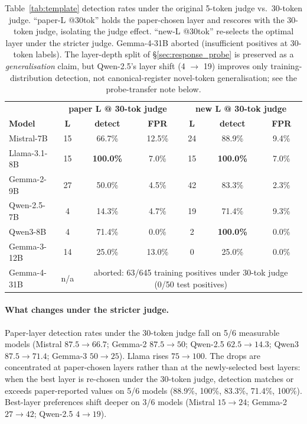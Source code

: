 \documentclass{article}
\begin{document}
\begin{table}[H]
\centering
\small
\caption{Table~\ref{tab:template} detection rates under the original 5-token judge vs.\ 30-token judge. ``paper-L @30tok'' holds the paper-chosen layer and rescores with the 30-token judge, isolating the judge effect. ``new-L @30tok'' re-selects the optimal layer under the stricter judge. Gemma-4-31B aborted (insufficient positives at 30-token labels). The layer-depth split of \S\ref{sec:response_probe} is preserved as a \emph{generalisation} claim, but Qwen-2.5's layer shift (4 $\to$ 19) improves only training-distribution detection, not canonical-register novel-token generalisation; see the probe-transfer note below.}
\label{tab:e9_table3}
\begin{tabular}{lccc|ccc}
\toprule
& \multicolumn{3}{c|}{\textbf{paper L @ 30-tok judge}} & \multicolumn{3}{c}{\textbf{new L @ 30-tok judge}} \\
\textbf{Model} & \textbf{L} & \textbf{detect} & \textbf{FPR} & \textbf{L} & \textbf{detect} & \textbf{FPR} \\
\midrule
Mistral-7B     & 15 & 66.7\% & 12.5\% & 24 & 88.9\% & 9.4\% \\
Llama-3.1-8B   & 15 & \textbf{100.0\%} & 7.0\% & 15 & \textbf{100.0\%} & 7.0\% \\
Gemma-2-9B     & 27 & 50.0\% & 4.5\% & 42 & 83.3\% & 2.3\% \\
Qwen-2.5-7B    & 4  & 14.3\% & 4.7\% & 19 & 71.4\% & 9.3\% \\
Qwen3-8B       & 4  & 71.4\% & 0.0\% & 2  & \textbf{100.0\%} & 0.0\% \\
Gemma-3-12B    & 14 & 25.0\% & 13.0\% & 0  & 25.0\% & 0.0\% \\
Gemma-4-31B    & n/a & \multicolumn{5}{c}{aborted: 63/645 training positives under 30-tok judge (0/50 test positives)} \\
\bottomrule
\end{tabular}
\end{table}

\paragraph{What changes under the stricter judge.} Paper-layer detection rates under the 30-token judge fall on 5/6 measurable models (Mistral $87.5\to 66.7$; Gemma-2 $87.5 \to 50$; Qwen-2.5 $62.5\to 14.3$; Qwen3 $87.5\to 71.4$; Gemma-3 $50\to 25$). Llama rises $75\to 100$. The drops are concentrated at paper-chosen layers rather than at the newly-selected best layers: when the best layer is re-chosen under the 30-token judge, detection matches or exceeds paper-reported values on 5/6 models (88.9\%, 100\%, 83.3\%, 71.4\%, 100\%). Best-layer preferences shift deeper on 3/6 models (Mistral $15\to 24$; Gemma-2 $27\to 42$; Qwen-2.5 $4\to 19$).
\end{document}

